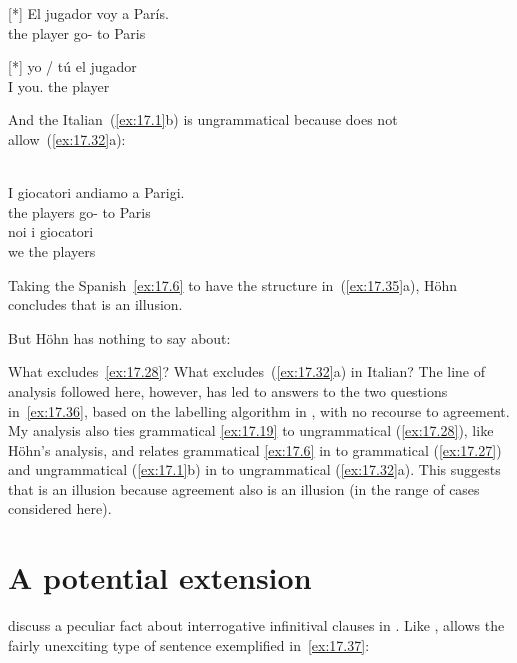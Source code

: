 \documentclass[output=paper]{langsci/langscibook}
\begin{document}
\begin{exe}
\exi{\eqref{ex:17.19}}[*]{%
    \gll El jugador voy a París.\\
        the player go-\Fsg{} to Paris\\
    \glt}
\end{exe}

\begin{exe}
\exi{\eqref{ex:17.28}}[*]{%
    \gll yo / tú el jugador\\
    I {} you.\Sg{} the player\\
    \glt}
\end{exe}
And the Italian~(\ref{ex:17.1}b) is ungrammatical because  does not
allow~(\ref{ex:17.32}a):

\begin{exe}[(32a)]
     \\
    \gll I giocatori andiamo a Parigi.\\
    the players go-\Fpl{} to Paris\\
    \glt
{}
    \gll    noi i giocatori\\
            we the players\\
    \glt
\end{exe}
Taking the Spanish~\eqref{ex:17.6} to have the structure in~(\ref{ex:17.35}a),
Höhn concludes that  is an illusion.

But Höhn has nothing to say about:

\ea\label{ex:17.36}
    \ea What excludes~\eqref{ex:17.28}?
    \ex What excludes~(\ref{ex:17.32}a) in Italian?
    \z
\z
The line of analysis followed here, however, has led to answers to the two
questions in~\eqref{ex:17.36}, based on the labelling algorithm in
\citet{Chomsky2013}, with no recourse to agreement. My analysis also ties
grammatical \eqref{ex:17.19} to ungrammatical (\ref{ex:17.28}), like Höhn’s
analysis, and relates grammatical \eqref{ex:17.6} in  to grammatical
(\ref{ex:17.27}) and ungrammatical (\ref{ex:17.1}b) in  to
ungrammatical (\ref{ex:17.32}a). This suggests that  is an
illusion because agreement also is an illusion (in the range of cases
considered here).

\section{A potential extension}\label{sec:17.8}

\citet{BosqueMoreno1984} discuss a peculiar fact about interrogative
infinitival clauses in . Like ,  allows the fairly
unexciting type of sentence exemplified in~\eqref{ex:17.37}:
\end{document}
